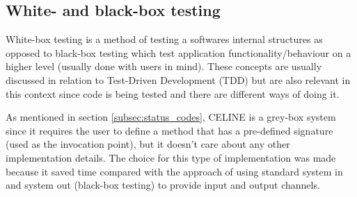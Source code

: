 \subsection{White- and black-box testing} \label{subsec:whitebox_blackbox}
White-box testing is a method of testing a softwares internal structures as opposed to black-box testing which test application functionality/behaviour on a higher level (usually done with users in mind). These concepts are usually discussed in relation to Test-Driven Development (TDD) but are also relevant in this context since code is being tested and there are different ways of doing it.  

As mentioned in section \ref{subsec:status_codes}, CELINE is a grey-box system since it requires the user to define a method that has a pre-defined signature (used as the invocation point), but it doesn't care about any other implementation details. The choice for this type of implementation was made because it saved time compared with the approach of using standard system in and system out (black-box testing) to provide input and output channels. 

